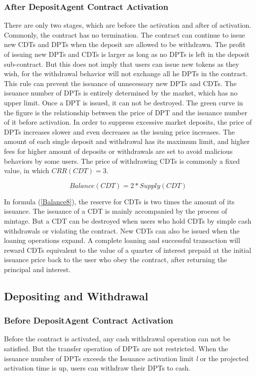 \documentclass[a4paper, 10pt, conference]{ieeeconf} %
\begin{document}
\subsubsection{After DepositAgent Contract Activation}
There are only two stages, which are before the activation and after of activation. Commonly, the contract has no termination. The contract can continue to issue new CDTs and DPTs when the deposit are allowed to be withdrawn. The profit of issuing new DPTs and CDTs is larger as long as no DPTs is left in the deposit sub-contract. But this does not imply that users can issue new tokens as they wish, for  the withdrawal behavior will not exchange all he DPTs in the contract. This rule can prevent the issuance of unnecessary new DPTs and CDTs. The issuance number of DPTs is entirely determined by the market, which has no upper limit. Once a DPT is issued, it can not be destroyed.
The green curve in the figure is the relationship between the price of DPT and the issuance number of it before activation. In order to suppress excessive market deposits, the price of DPTs increases slower and even decreases as the issuing price increases. The amount of each single deposit and withdrawal has its maximum limit, and higher fees for higher amount of deposits or withdrawals are set to avoid malicious behaviors by some users. The price of withdrawing CDTs is commonly a fixed value, in which ${CRR(CDT) = 3}$.

\begin{equation}\label{Balance8}
{Balance(CDT) = 2 * Supply(CDT)}
\end{equation}

In formula (\ref{Balance8}), the reserve for CDTs is two times the amount of its issuance. The issuance of a CDT is mainly accompanied by the process of mintage. But a CDT can be destroyed when users who hold CDTs by simple cash withdrawals or violating the contract. New CDTs can also be issued when the loaning operations expand. A complete loaning and successful transaction will reward CDTs equivalent to the value of a quarter of interest prepaid at the initial issuance price back to the user who obey the contract, after returning the principal and interest.

\subsection{Depositing and Withdrawal}
\subsubsection{Before DepositAgent Contract Activation}
Before the contract is activated, any cash withdrawal operation can not be satisfied. But the transfer operation of DPTs are not restricted. When the issuance number of DPTs exceeds the Issuance activation limit \emph{l} or the projected activation time is up, users can withdraw their DPTs to cash.
\end{document}
